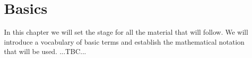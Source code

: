 \chapter{Basics}
In this chapter we will set the stage for all the material that will follow. We will introduce a vocabulary of basic terms and establish the mathematical notation that will be used. ...TBC...


\begin{comment}
Maybe make a section about summation, product, factorial binomial coeffs, etc. include also:

https://en.wikipedia.org/wiki/Periodic_summation

\end{comment}
